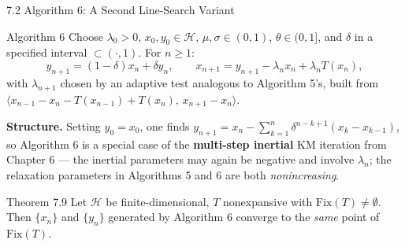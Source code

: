 \documentclass[aspectratio=169,10pt]{beamer}
\newcommand{\mHH}{\mathcal H}
\newcommand{\inner}[2]{\langle #1, #2 \rangle}
\newcommand{\Fix}{\mathrm{Fix}}
\begin{document}
\begin{frame}{7.2 Algorithm 6: A Second Line-Search Variant}

  \begin{block}{Algorithm 6}
    Choose $\lambda_0>0$, $x_0,y_0\in\mHH$, $\mu,\sigma\in(0,1)$,
    $\theta\in(0,1]$, and $\delta$ in a specified interval
    $\subset(\cdot,1)$. For $n\ge1$:
    \[
      y_{n+1}=(1-\delta)x_n+\delta y_n, \qquad
      x_{n+1}=y_{n+1}-\lambda_n x_n+\lambda_n T(x_n),
    \]
    with $\lambda_{n+1}$ chosen by an adaptive test analogous to
    Algorithm 5's, built from
    $\inner{x_{n-1}-x_n-T(x_{n-1})+T(x_n)}{\,x_{n+1}-x_n}$.
  \end{block}

  \textbf{Structure.} Setting $y_0=x_0$, one finds
  $y_{n+1}=x_n-\sum_{k=1}^n\delta^{n-k+1}(x_k-x_{k-1})$, so Algorithm
  6 is a special case of the \textbf{multi-step inertial} KM
  iteration from Chapter 6 --- the inertial parameters may again be
  negative and involve $\lambda_n$; the relaxation parameters in
  Algorithms 5 and 6 are both \emph{nonincreasing}.

  \begin{alertblock}{Theorem 7.9}
    Let $\mHH$ be finite-dimensional, $T$ nonexpansive with
    $\Fix(T)\neq\emptyset$. Then $\{x_n\}$ and $\{y_n\}$ generated by
    Algorithm 6 converge to the \emph{same} point of $\Fix(T)$.
  \end{alertblock}

\end{frame}
\end{document}
